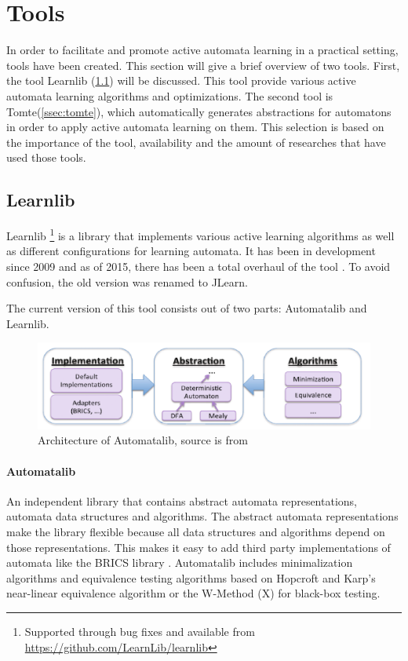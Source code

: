 \documentclass[multi,crop=false,class=article]{standalone}
\begin{document}
\section{Tools}
\label{sec:tools}

In order to facilitate and promote active automata learning in a practical
setting, tools have been created. This section will give a brief overview of two
tools. First, the tool Learnlib (\ref{ssec:learnlib}) will be discussed. This
tool provide various active automata learning algorithms and optimizations. The
second tool is Tomte(\ref{ssec:tomte}), which automatically generates
abstractions for automatons in order to apply active automata learning on them.
This selection is based on the importance of the tool, availability and the
amount of researches that have used those tools.

\subsection{Learnlib}
\label{ssec:learnlib}

Learnlib \footnote{Supported through bug fixes and available from
\url{https://github.com/LearnLib/learnlib}} is a library that implements various
active learning algorithms as well as different configurations for learning
automata. It has been in development since 2009 \cite{Raffelt2009} and as of
2015, there has been a total overhaul of the tool \cite{Isberner2015}. To avoid
confusion, the old version was renamed to JLearn.

The current version of this tool consists out of two parts: Automatalib and
Learnlib.

\begin{figure}[!ht]
	\includegraphics[width=\textwidth]{Tool_images/automatalib_architecture.png}
	\caption{Architecture of Automatalib, source is from \cite{Isberner2015}}
	\label{fig:automatalib_arch}
\end{figure}

\paragraph{Automatalib} An independent library that contains abstract automata
representations, automata data structures and algorithms. The abstract automata
representations make the library flexible because all data structures and
algorithms depend on those representations. This makes it easy to add third
party implementations of automata like the BRICS library \cite{Alur2005}.
Automatalib includes minimalization algorithms and equivalence testing
algorithms based on Hopcroft and Karp's near-linear equivalence algorithm
\cite{hopcroft1971} or the W-Method (X) 
for black-box testing.
\end{document}
